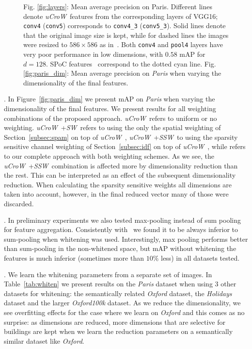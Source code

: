 \documentclass[runningheads]{llncs}
\newcommand{\uCrow}{\textit{uCroW}~}
\newcommand{\sCrow}{\textit{SW}~} \newcommand{\cCrow}{\textit{SSW}~}
\begin{document}
\begin{figure}[t]
\caption{Fig. \ref{fig:layers}: Mean average precision on Paris. Different lines denote \uCrow features from the corresponding layers of VGG16; \texttt{conv4} (\texttt{conv5}) corresponds to \texttt{conv4\_3} (\texttt{conv5\_3}). Solid lines denote that the original image size is kept, while for dashed lines the images were resized to $586 \times 586$ as in~\cite{BaLe15}.  Both \texttt{conv4} and \texttt{pool4} layers have very poor performance in low dimensions, with $0.58$ mAP for $d=128$. SPoC features~\cite{BaLe15} correspond to the dotted cyan line. Fig. \ref{fig:paris_dim}: Mean average precision on \emph{Paris} when varying the dimensionality of the final features.}

\end{figure}






.
In Figure~\ref{fig:paris_dim} we present mAP on \emph{Paris} when varying the dimensionality of the final features. We present results for all weighting combinations of the proposed approach. \uCrow refers to uniform or no weighting. \uCrow+\sCrow refers to using the only the spatial weighting of Section~\ref{subsec:spam} on top of \uCrow, \uCrow+\cCrow to using the sparsity sensitive channel weighting of Section~\ref{subsec:idf} on top of \uCrow, while \Crow refers to our complete approach with both weighting schemes. As we see, the \uCrow+\cCrow combination is affected more by dimensionality reduction than the rest. This can be interpreted as an effect of the subsequent dimensionality reduction. When calculating the sparsity sensitive weights all dimensions are taken into account, however, in the final reduced vector many of those were discarded. 











.
In preliminary experiments we also tested  max-pooling instead of sum pooling for feature aggregation. Consistently with~\cite{BaLe15} we found it to be always inferior to sum-pooling when whitening was used. Interestingly, max pooling performs better than sum-pooling in the non-whitened space, but mAP without whitening the features is much inferior (sometimes more than $10\%$ less) in all datasets tested.

. We learn the whitening parameters from a separate set of images. In Table~\ref{tab:whiten} we present results on the \emph{Paris} dataset when using 3 other datasets for whitening: the semantically related \emph{Oxford} dataset, the \emph{Holidays} dataset and the larger \emph{Oxford100k} dataset. As we reduce the dimensionality, we see overfitting effects for the case where we learn on \emph{Oxford} and this comes as no surprise: as dimensions are reduced, more dimensions that are selective for buildings are kept when we learn the reduction parameters on a semantically similar dataset like \emph{Oxford}.
\end{document}
